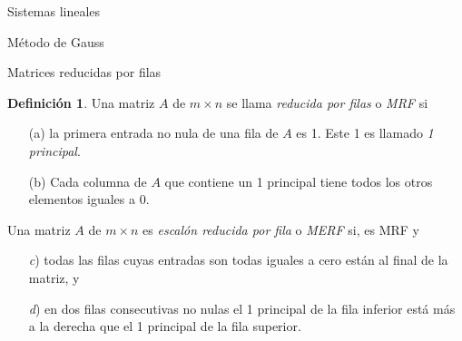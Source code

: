 \documentclass[a4paper,12pt,twoside,spanish,reqno]{amsbook}
\theoremstyle{definition}
\newtheorem{definicion}{Definici\'on}[section]
\theoremstyle{remark}
\begin{document}
\begin{chapter}{Sistemas lineales}
\begin{section}{Método de Gauss }
\begin{subsection}{Matrices reducidas por filas}
                \begin{definicion}
                    Una matriz $A$ de $m \times n$ se llama \textit{reducida por filas} o \textit{MRF} si 
                    \begin{enumerate}
                        \item[(a)] la primera entrada no nula de una fila de $A$ es 1. Este 1 es llamado \textit{1 principal}.
                        \item[(b)] Cada columna de $A$ que contiene un  1 principal tiene todos los otros elementos iguales a 0. 
                    \end{enumerate} 
                Una matriz $A$ de $m \times n$ es \textit{escalón reducida por fila} o \textit{MERF} si,  es  MRF y
                \begin{enumerate}
                    \item[\textit{c})] todas las filas cuyas entradas son todas iguales a cero están al final de la matriz, y
                    \item[\textit{d})] en dos filas consecutivas no nulas el 1 principal de la fila inferior está más a la derecha que el 1 principal de la fila superior. 
                \end{enumerate}
                
                \end{definicion} 
                

\end{subsection}
\end{section}
\end{chapter}
\end{document}
